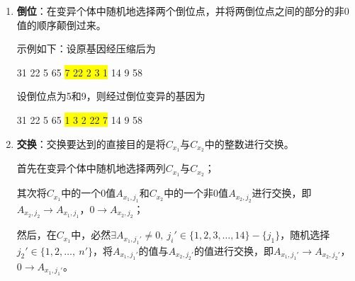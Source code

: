 \documentclass[UTF8,cs4size]{ctexart}
\begin{document}
\begin{enumerate}
\item \textbf{倒位}：在变异个体中随机地选择两个倒位点，并将两倒位点之间的部分的非0值的顺序颠倒过来。

示例如下：设原基因经压缩后为
\begin{center}
31 22 5 65 \colorbox{yellow}{7 22 2 3 1} 14 9 58
\end{center}
设倒位点为5和9，则经过倒位变异的基因为
\begin{center}
31 22 5 65 \colorbox{yellow}{1 3 2 22 7} 14 9 58
\end{center}
\item \textbf{交换}：交换要达到的直接目的是将$C_{x_1}$与$C_{x_2}$中的整数进行交换。

首先在变异个体中随机地选择两列$C_{x_1}$与$C_{x_2}$；

其次将$C_{x_1}$中的一个0值$A_{x_1,j_1}$和$C_{x_2}$中的一个非0值$A_{x_2,j_2}$进行交换，即$A_{x_2,j_2} \to A_{x_1,j_1}$，$0 \to A_{x_2,j_2}$；

然后，在$C_{x_1}$中，必然$\exists A_{x_1,j_1'} \neq 0,\ j_i' \in \{1, 2, 3, \ldots,  14\} - \{j_1\}$，随机选择$j_2' \in \{1,2,\ldots,\ n' \}$，将$A_{x_1,j_1'}$的值与$A_{x_2,j_2'}$的值进行交换，即$A_{x_1,j_1'} \to A_{x_2,j_2'}$，$0 \to A_{x_1,j_1'}$。


\end{enumerate}
\end{document}
